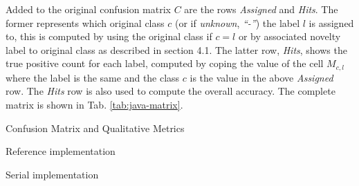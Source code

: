 Added to the original confusion matrix $C$ are the rows \emph{Assigned} and
\emph{Hits}.
The former represents which original class $c$ (or if \emph{unknown}, \emph{``-''}) the
label $l$ is assigned to, this is computed by using the original class if
$c = l$ or by associated novelty label to original class as described in
\cite{DeFaria2015} section 4.1.
The latter row, \emph{Hits}, shows the true positive count for each label,
computed by coping the value of the cell $M_{c, l}$ where the label is the same
and the class $c$ is the value in the above \emph{Assigned} row.
The \emph{Hits} row is also used to compute the overall accuracy.
The complete matrix is shown in Tab. \ref{tab:java-matrix}.

%   

\begin{table}[htb]
\caption{Confusion Matrix and Qualitative Metrics}
\label{tab:confusion-matrixes-ref-serial}
\begin{subtable}[h]{0.9\textwidth}\begin{center}
    \caption{Reference implementation}
    
    \label{tab:java-matrix}
\end{center}\end{subtable}
\begin{subtable}[h]{0.9\textwidth}\begin{center}
    \caption{Serial implementation}
    
    \label{tab:libc-matrix}
\end{center}\end{subtable}
\end{table}

